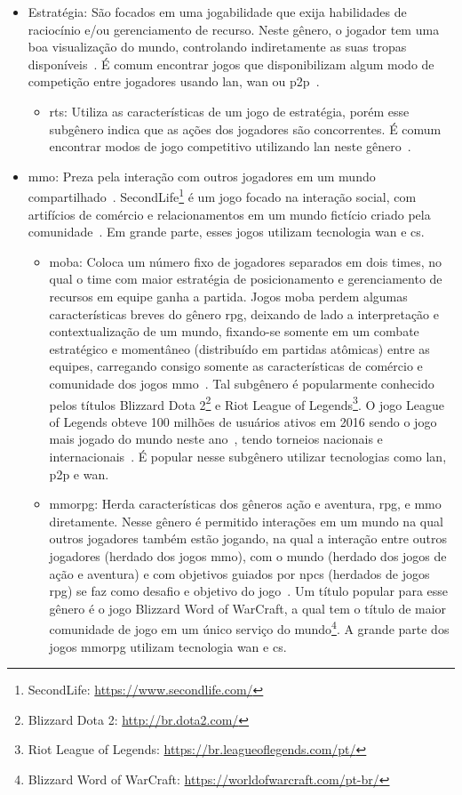 \begin{itemize}
  \item Estratégia: São focados em uma jogabilidade que exija habilidades de raciocínio e/ou gerenciamento de recurso. Neste gênero, o jogador tem uma boa visualização do mundo, controlando indiretamente as suas tropas disponíveis~\cite{rollings2003andrew}. É comum encontrar jogos que disponibilizam algum modo de competição entre jogadores usando \ac{lan}, \ac{wan} ou \ac{p2p}~\cite{adams_1208533}.
    \begin{itemize}
      \item \ac{rts}: Utiliza as características de um jogo de estratégia, porém esse subgênero indica que as ações dos jogadores são concorrentes. É comum encontrar modos de jogo competitivo utilizando \ac{lan} neste gênero~\cite{adams_1208533}.
    \end{itemize}
  \item \ac{mmo}: Preza pela interação com outros jogadores em um mundo compartilhado~\cite{adams_1208533}. SecondLife\footnote{SecondLife: \url{https://www.secondlife.com/}} é um jogo focado na interação social, com artifícios de comércio e relacionamentos em um mundo fictício criado pela comunidade~\cite{tecmundo_secondlife}. Em grande parte, esses jogos utilizam tecnologia \ac{wan} e \ac{cs}.
    \begin{itemize}
      \item \ac{moba}: Coloca um número fixo de jogadores separados em dois times, no qual o time com maior estratégia de posicionamento e gerenciamento de recursos em equipe ganha a partida. Jogos \ac{moba} perdem algumas características breves do gênero \ac{rpg}, deixando de lado a interpretação e contextualização de um mundo, fixando-se somente em um combate estratégico e momentâneo (distribuído em partidas atômicas) entre as equipes, carregando consigo somente as características de comércio e comunidade dos jogos \ac{mmo}~\cite{adams_1208533}. Tal subgênero é popularmente conhecido pelos títulos Blizzard Dota 2\footnote{Blizzard Dota 2: \url{http://br.dota2.com/}} e Riot League of Legends\footnote{Riot League of Legends: \url{https://br.leagueoflegends.com/pt/}}. O jogo League of Legends obteve 100 milhões de usuários ativos em 2016 sendo o jogo mais jogado do mundo neste ano~\cite{lol_statista}, tendo torneios nacionais e internacionais~\cite{lol_sportv}. É popular nesse subgênero utilizar tecnologias como \ac{lan}, \ac{p2p} e \ac{wan}.
      \item \ac{mmorpg}: Herda características dos gêneros ação e aventura, \ac{rpg}, e \ac{mmo} diretamente. Nesse gênero é permitido interações em um mundo na qual outros jogadores também estão jogando, na qual a interação entre outros jogadores (herdado dos jogos \ac{mmo}), com o mundo (herdado dos jogos de ação e aventura) e com objetivos guiados por \acp{npc} (herdados de jogos \ac{rpg}) se faz como desafio e objetivo do jogo~\cite{adams_1208533}. Um título popular para esse gênero é o jogo Blizzard Word of WarCraft, a qual tem o título de maior comunidade de jogo em um único serviço do mundo\footnote{Blizzard Word of WarCraft: \url{https://worldofwarcraft.com/pt-br/}}. A grande parte dos jogos \ac{mmorpg} utilizam tecnologia \ac{wan} e \ac{cs}.

\end{itemize}
\end{itemize}
